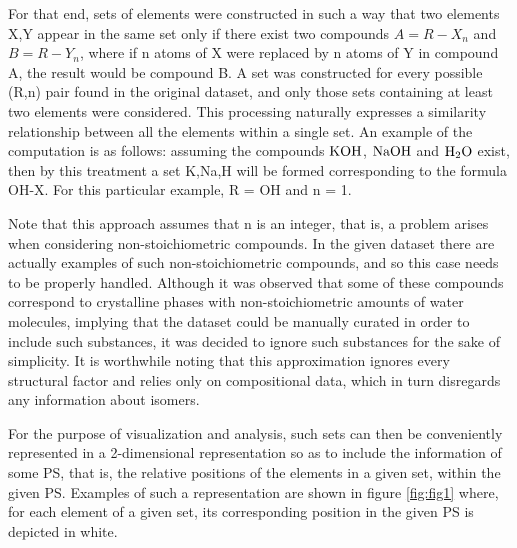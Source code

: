 \documentclass[]{article}
\begin{document}
For that end, sets of elements were constructed in such a way that two elements X,Y appear in the same set only if there exist two compounds $A = R-X_n$ and $B = R-Y_n$, where if n atoms of X were replaced by n atoms of Y in compound A, the result would be compound B. A set was constructed for every possible (R,n) pair found in the original dataset, and only those sets containing at least two elements were considered. This processing naturally expresses a similarity relationship between all the elements within a single set. An example of the computation is as follows: assuming the compounds $\ce{KOH}$, $\ce{NaOH}$ and $\ce{H2O}$ exist, then by this treatment a set {K,Na,H} will be formed corresponding to the formula OH-X. For this particular example, R = OH and n = 1.

Note that this approach assumes that n is an integer, that is, a problem arises when considering non-stoichiometric compounds. In the given dataset there are actually examples of such non-stoichiometric compounds, and so this case needs to be properly handled. Although it was observed that some of these compounds correspond to crystalline phases with non-stoichiometric amounts of water molecules, implying that the dataset could be manually curated in order to include such substances, it was decided to ignore such substances for the sake of simplicity.
It is worthwhile noting that this approximation ignores every structural factor and relies only on compositional data, which in turn disregards any information about isomers.

For the purpose of visualization and analysis, such sets can then be conveniently represented in a 2-dimensional representation so as to include the information of some PS, that is, the relative positions of the elements in a given set, within the given PS. Examples of such a representation are shown in figure \ref{fig:fig1} where, for each element of a given set, its corresponding position in the given PS is depicted in white. 
\end{document}
